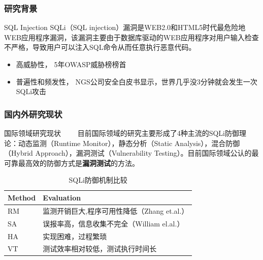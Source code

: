 \documentclass{beamer}
\begin{document}
\begin{CJK*}{UTF8}{}
\begin{frame}
\end{frame}



\begin{frame}
\frametitle{研究背景}
\begin{block}{SQL Injection}
SQLi（SQL injection）漏洞是WEB2.0和HTML5时代最危险地WEB应用程序漏洞，该漏洞主要由于数据库驱动的WEB应用程序对用户输入检查不严格，导致用户可以注入SQL命令从而任意执行恶意代码。
\end{block}
\begin{itemize}
\item 高威胁性， 5年OWASP威胁榜榜首
\item 普遍性和频发性， NGS公司安全白皮书显示，世界几乎没3分钟就会发生一次SQLi攻击
\end{itemize}
\end{frame}


\begin{frame}
\frametitle{国内外研究现状}
\begin{block}{国际领域研究现状}
~~~~目前国际领域的研究主要形成了4种主流的SQLi防御理论：动态监测（Runtime Monitor），静态分析（Static Analysis），混合防御（Hybrid Approach），漏洞测试（Vulnerability Testing）。目前国际领域公认的最可靠最高效的防御方式是{\bf 漏洞测试}的方法。\\
\begin{table}
\begin{tabular}{l l}
\toprule
\textbf{Method} & \textbf{Evaluation}\\
\midrule
RM & 监测开销巨大,程序可用性降低（Zhang et.al.） \\
SA & 误报率高，信息收集不完全（William el.al.） \\
HA & 实现困难，过程繁琐 \\
VT & 测试效率相对较低，测试执行时间长\\
\bottomrule
\end{tabular}
\caption{SQLi防御机制比较}
\end{table}
\end{block}

\end{frame}




\end{CJK*}
\end{document}
